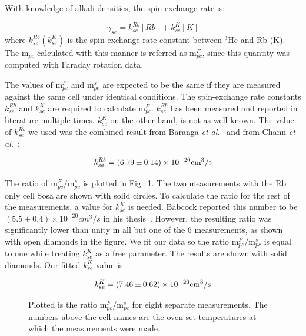 With knowledge of alkali densities, the spin-exchange rate is:

\begin{equation}\label{gammasefr}
\gamma_{se}=k_{se}^{Rb}[Rb]+k_{se}^{K}[K]
\end{equation}
where $k_{se}^{Rb}(k_{se}^{K})$ is the spin-exchange rate constant between $^{3}$He and Rb (K). The m$_{pc}$ calculated with this manner is referred as m$_{pc}^{F}$, since this quantity was computed with Faraday rotation data.

The values of m$_{pc}^{F}$ and m$_{pc}^{s}$ are expected to be the same if they are measured against the same cell under identical conditions. The spin-exchange rate constants $k_{se}^{Rb}$ and $k_{se}^{K}$ are required to calculate m$_{pc}^{F}$. $k_{se}^{Rb}$ has been measured and reported in literature multiple times. $k_{se}^{K}$ on the other hand, is not as well-known. The value of $k_{se}^{Rb}$ we used was the combined result from Baranga \emph{et al.}~\cite{PhysRevLett.80.2801} and from Chann \emph{et al.}~\cite{PhysRevA.66.032703}:

\begin{equation}
k_{se}^{Rb}=(6.79\pm 0.14)\times 10^{-20}{\rm cm}^{3}/{\rm s}
\end{equation}

The ratio of m$_{pc}^{F}$/m$_{pc}^{s}$ is plotted in Fig.~\ref{m_ratio}. The two measurements with the Rb only cell Sosa are shown with solid circles. To calculate the ratio for the rest of the measurements, a value for $k_{se}^{K}$ is needed. Babcock reported this number to be $(5.5\pm 0.4)\times 10^{-20}cm^{3}/s$ in his thesis~\cite{BabcockThesis}. However, the resulting ratio was significantly lower than unity in all but one of the 6 measurements, as shown with open diamonds in the figure. We fit our data so the ratio m$_{pc}^{F}$/m$_{pc}^{s}$ is equal to one while treating $k_{se}^{K}$ as a free parameter. The results are shown with solid diamonds. Our fitted $k_{se}^{K}$ value is

\begin{equation}
k_{se}^{K}=(7.46\pm 0.62)\times 10^{-20}{\rm cm}^{3}/{\rm s}
\end{equation}

\begin{figure}[t!]
	\label{m_ratio}
	\centering
	\caption{{Plotted is the ratio m$_{pc}^{F}$/m$_{pc}^{s}$ for eight separate measurements. The numbers above the cell names are the oven set temperatures at which the measurements were made.}}
\end{figure}

